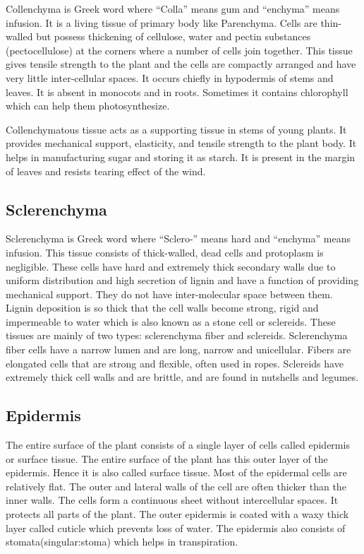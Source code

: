 Collenchyma is Greek word where ``Colla'' means gum and ``enchyma'' means infusion. It is a living tissue of primary body like Parenchyma. Cells are thin-walled but possess thickening of cellulose, water and pectin substances (pectocellulose) at the corners where a number of cells join together. This tissue gives tensile strength to the plant and the cells are compactly arranged and have very little inter-cellular spaces. It occurs chiefly in hypodermis of stems and leaves. It is absent in monocots and in roots. Sometimes it contains chlorophyll which can help them photosynthesize.

Collenchymatous tissue acts as a supporting tissue in stems of young plants. It provides mechanical support, elasticity, and tensile strength to the plant body. It helps in manufacturing sugar and storing it as starch. It is present in the margin of leaves and resists tearing effect of the wind.

\hypertarget{sclerenchyma}{%
\subsection{Sclerenchyma}\label{sclerenchyma}}

Sclerenchyma is Greek word where ``Sclero-'' means hard and ``enchyma'' means infusion. This tissue consists of thick-walled, dead cells and protoplasm is negligible. These cells have hard and extremely thick secondary walls due to uniform distribution and high secretion of lignin and have a function of providing mechanical support. They do not have inter-molecular space between them. Lignin deposition is so thick that the cell walls become strong, rigid and impermeable to water which is also known as a stone cell or sclereids. These tissues are mainly of two types: sclerenchyma fiber and sclereids. Sclerenchyma fiber cells have a narrow lumen and are long, narrow and unicellular. Fibers are elongated cells that are strong and flexible, often used in ropes. Sclereids have extremely thick cell walls and are brittle, and are found in nutshells and legumes.

\hypertarget{epidermis}{%
\subsection{Epidermis}\label{epidermis}}

The entire surface of the plant consists of a single layer of cells called epidermis or surface tissue. The entire surface of the plant has this outer layer of the epidermis. Hence it is also called surface tissue. Most of the epidermal cells are relatively flat. The outer and lateral walls of the cell are often thicker than the inner walls. The cells form a continuous sheet without intercellular spaces. It protects all parts of the plant. The outer epidermis is coated with a waxy thick layer called cuticle which prevents loss of water. The epidermis also consists of stomata(singular:stoma) which helps in transpiration.

